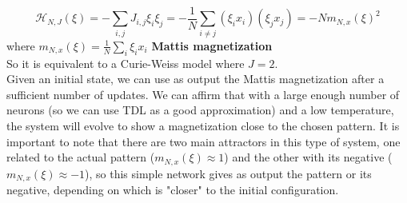 \[
\mathcal{H}_{N,J}(\xi) = - \sum_{i,j} J_{i,j} \xi_i \xi_j = - \frac{1}{N} \sum_{i\neq j} (\xi_i x_i)(\xi_j x_j) = - N m_{N,x}(\xi)^2
\]
where $m_{N,x}(\xi) = \frac{1}{N} \sum_i \xi_i x_i $ \quad \textbf{Mattis magnetization}\\
So it is equivalent to a Curie-Weiss model where $J = 2$.\\
Given an initial state, we can use as output the Mattis magnetization after a sufficient number of updates. We can affirm that with a large enough number of neurons (so we can use TDL as a good approximation) and a low temperature, the system will evolve to show a magnetization close to the chosen pattern. It is important to note that there are two main attractors in this type of system, one related to the actual pattern ($m_{N,x}(\xi) \approx 1$) and the other with its negative ($m_{N,x}(\xi) \approx -1$), so this simple network gives as output the pattern or its negative, depending on which is "closer" to the initial configuration.
